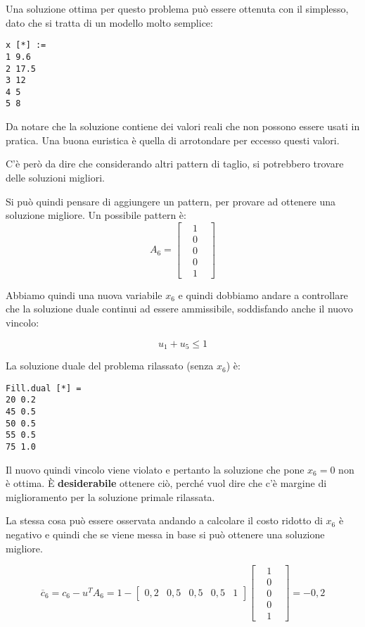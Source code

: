 Una soluzione ottima per questo problema può essere ottenuta con il simplesso, dato che si tratta di un modello molto semplice:

\begin{verbatim}
x [*] := 
1 9.6
2 17.5 
3 12 
4 5 
5 8
\end{verbatim}

Da notare che la soluzione contiene dei valori reali che non possono essere usati in pratica. 
Una buona euristica è quella di arrotondare per eccesso questi valori.

C'è però da dire che considerando altri pattern di taglio, si potrebbero trovare delle soluzioni migliori.

Si può quindi pensare di aggiungere un pattern, per provare ad ottenere una soluzione migliore.
Un possibile pattern è:
$$
 A_6 = \begin{bmatrix}
	&1& \\
	&0& \\
	&0& \\
	&0& \\
	&1&
\end{bmatrix}
$$

Abbiamo quindi una nuova variabile $x_6$ e quindi dobbiamo andare a controllare che la soluzione duale continui ad essere ammissibile, soddisfando anche il nuovo vincolo:

$$
u_1 + u_5 \leq 1
$$

La soluzione duale del problema rilassato (senza $x_6$) è:

\begin{verbatim}
Fill.dual [*] =
20 0.2
45 0.5
50 0.5
55 0.5
75 1.0
\end{verbatim}

Il nuovo quindi vincolo viene violato e pertanto la soluzione che pone $x_6 = 0$ non è ottima. 
\`E \textbf{desiderabile} ottenere ciò, perché vuol dire che c'è margine di miglioramento per la soluzione primale rilassata.

La stessa cosa può essere osservata andando a calcolare il costo ridotto di $x_6$ è negativo e quindi che se viene messa in base si può ottenere una soluzione migliore.

$$
\overline{c}_6 = c_6 - u^TA_6 = 1 - \begin{bmatrix}
0,2 & 0,5 & 0,5 & 0,5 & 1
\end{bmatrix} \begin{bmatrix}
&1& \\
&0& \\
&0& \\
&0& \\
&1&
\end{bmatrix} = -0,2
$$


